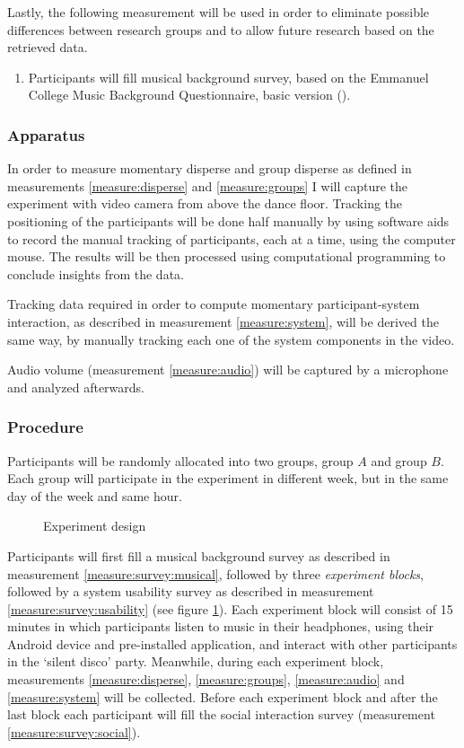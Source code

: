 \documentclass[a4paper,11pt]{article}
\newcommand{\definition}[1]{\emph{#1}}
\begin{document}
Lastly, the following measurement will be used in order to eliminate possible differences between research groups and to allow future research based on the retrieved data.
\begin{enumerate}[resume]
	\item \label{measure:survey:musical} Participants will fill musical background survey, based on the Emmanuel College Music Background Questionnaire, basic version (\cite{web:zhao12}).
\end{enumerate}

\subsubsection{Apparatus}

In order to measure momentary disperse and group disperse as defined in measurements \ref{measure:disperse} and \ref{measure:groups} I will capture the experiment with video camera from above the dance floor.
Tracking the positioning of the participants will be done half manually by using software aids to record the manual tracking of participants, each at a time, using the computer mouse.
The results will be then processed using computational programming to conclude insights from the data.

Tracking data required in order to compute momentary participant-system interaction, as described in measurement \ref{measure:system}, will be derived the same way, by manually tracking each one of the system components in the video.

Audio volume (measurement \ref{measure:audio}) will be captured by a microphone and analyzed afterwards.

\subsubsection{Procedure}

Participants will be randomly allocated into two groups, group $A$ and group $B$\@.
Each group will participate in the experiment in different week, but in the same day of the week and same hour.

\begin{figure}[!htb]
	\centering
	\def\svgwidth{0.8\textwidth}
  	
	\caption{Experiment design}\label{fig:experiment}
\end{figure}

Participants will first fill a musical background survey as described in measurement \ref{measure:survey:musical}, followed by three \definition{experiment blocks}, followed by a system usability survey as described in measurement \ref{measure:survey:usability} (see figure \ref{fig:experiment}).
Each experiment block will consist of 15 minutes in which participants listen to music in their headphones, using their Android device and pre-installed application, and interact with other participants in the `silent disco' party.
Meanwhile, during each experiment block, measurements \ref{measure:disperse}, \ref{measure:groups}, \ref{measure:audio} and \ref{measure:system} will be collected.
Before each experiment block and after the last block each participant will fill the social interaction survey (measurement \ref{measure:survey:social}).
\end{document}

